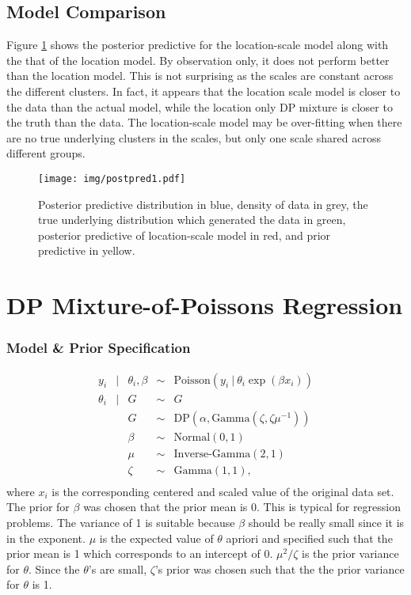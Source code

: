 \documentclass{article}
\def\beginmyfig{\begin{figure}[h]\center}
\def\endmyfig{\end{figure}}
\begin{document}
\subsection{Model Comparison}
Figure \ref{fig:postpred1} shows the posterior predictive for the
location-scale model along with the that of the location model. By observation
only, it does not perform better than the location model. This is not
surprising as the scales are constant across the different clusters. In fact,
it appears that the location scale model is closer to the data than the actual
model, while the location only DP mixture is closer to the truth than the data.
The location-scale model may be over-fitting when there are no true underlying
clusters in the scales, but only one scale shared across different groups.
\beginmyfig
  \texttt{[image: img/postpred1.pdf]}
  \caption{Posterior predictive distribution in blue, density of data in grey, the true
  underlying distribution which generated the data in green, posterior predictive of
  location-scale model in red, and prior predictive in yellow.}
  \label{fig:postpred1}
\endmyfig

\section{DP Mixture-of-Poissons Regression}
\subsubsection{Model \& Prior Specification}
\[
  \begin{array}{rclcl}
    y_i &|& \theta_i,\beta &\sim& \text{Poisson}(y_i~|~\theta_i\exp{(\beta x_i)}) \\
    \theta_i &|& G &\sim& G \\
             && G &\sim& \text{DP}(\alpha,\text{Gamma}(\zeta,\zeta\mu^{-1})) \\
             && \beta &\sim& \text{Normal}(0,1) \\
             && \mu &\sim& \text{Inverse-Gamma}(2,1) \\
             && \zeta &\sim& \text{Gamma}(1,1),\\
  \end{array}
\]
where $x_i$ is the corresponding centered and scaled value of the original data
set.  The prior for $\beta$ was chosen that the prior mean is 0. This is
typical for regression problems. The variance of 1 is suitable because $\beta$
should be really small since it is in the exponent. $\mu$ is the expected value
of $\theta$ apriori and specified such that the prior mean is 1 which corresponds
to an intercept of 0. $\mu^2/\zeta$ is the prior variance for $\theta$. Since
the $\theta$'s are small, $\zeta$'s prior was chosen such that the the prior
variance for $\theta$ is 1.\\
\end{document}
